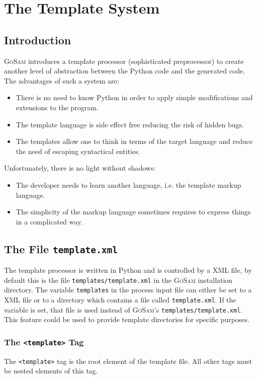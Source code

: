 \documentclass[11pt,a4paper]{refrep}
\newcommand{\golem}{\textsc{GoSam}\xspace}
\newcommand{\python}{Python\xspace}
\begin{document}
\chapter{The Template System}
\section{Introduction}
\golem{} introduces a template processor (sophisticated preprocessor)
to create another level of abstraction between the \python{} code and
the generated code. The advantages of such a system are:
\begin{itemize}
\item There is no need to know \python{} in order to apply simple
   modifications and extensions to the program.
\item The template language is side effect free reducing the risk
   of hidden bugs.
\item The templates allow one to think in terms of the target language
   and reduce the need of escaping syntactical entities.
\end{itemize}
Unfortunately, there is no light without shadows:
\begin{itemize}
\item The developer needs to learn another language, i.e. the
   template markup language.
\item The simplicity of the markup language sometimes requires
   to express things in a complicated way.
\end{itemize}

\section{The File \texttt{template.xml}}
The template processor is written in \python{} and is controlled
by a XML file, by default this is the file \texttt{templates/template.xml}
in the \golem{} installation directory.
\attention The variable \texttt{templates} in the process input file
can either be set to a XML file or to a directory which contains
a file called \texttt{template.xml}.
If the variable is set, that
file is used instead of \golem{}'s \texttt{templates/template.xml}.
This feature could be used to provide template directories for specific
purposes.

\subsection{The \texttt{<template>} Tag}
The \texttt{<template>} tag is the root element of the template file.
All other tags must be nested elements of this tag.
\end{document}
